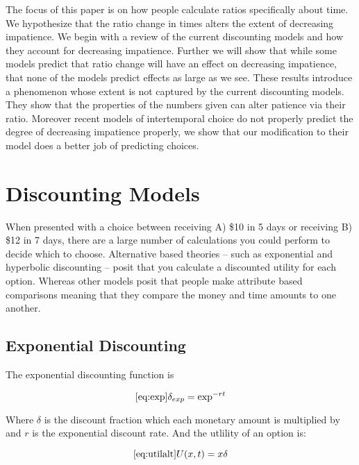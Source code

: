\documentclass[]{article}
\begin{document}
The focus of this paper is on how people calculate ratios specifically about time. 
We hypothesize that the ratio change in times alters the extent of decreasing impatience. 
We begin with a review of the current discounting models and how they account for decreasing impatience. 
Further we will show that while some models predict that ratio change will have an effect on decreasing impatience, that none of the models predict effects as large as we see. 
These results introduce a phenomenon whose extent is not captured by the current discounting models. 
They show that the properties of the numbers given can alter patience via their ratio. 
Moreover recent models of intertemporal choice do not properly predict the degree of decreasing impatience properly, we show that our modification to their model does a better job of predicting choices. 
 



\section{Discounting Models}

When presented with a choice between receiving A) \$10 in 5 days or receiving B) \$12 in 7 days, there are a large number of calculations you could perform to decide which to choose.  Alternative based theories -- such as exponential and hyperbolic discounting -- posit that you calculate a discounted utility for each option. Whereas other models posit that people make attribute based comparisons meaning that they compare the money and time amounts to one another. 

\subsection{Exponential Discounting}

The exponential discounting function is  

\begin{equation}\ref{eq:exp}
	\delta_{exp} = \exp^{-rt}
\end{equation}


Where $\delta$ is the discount fraction which each monetary amount is multiplied by and $r$ is the exponential discount rate. And the utlility of an option is:

\begin{equation}\ref{eq:utilalt}
	U(x, t) = x \delta
\end{equation}
\end{document}
